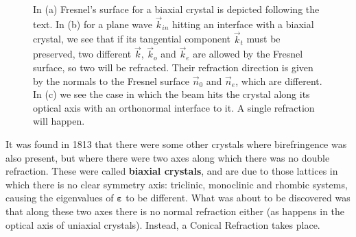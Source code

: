 \documentclass[11pt, a4paper, twoside]{article} %
\begin{document}
\begin{figure}[h!] 
     \centering 
    \begin{subfigure}[b]{0.32\linewidth}
     \end{subfigure}
 \begin{subfigure}[b]{0.33\linewidth}
     \end{subfigure}
 \begin{subfigure}[b]{0.32\linewidth}
     \end{subfigure}
    \caption{In (a) Fresnel's surface for a biaxial crystal is depicted following the text. In (b) for a plane wave $\vec{k}_{in}$ hitting an interface with a biaxial crystal, we see that if its tangential component $\vec{k}_t$ must be preserved, two different $\vec{k}$, $\vec{k}_o$ and $\vec{k}_e$ are allowed by the Fresnel surface, so two will be refracted. Their refraction direction is given by the normals to the Fresnel surface $\vec{n}_0$ and $\vec{n}_e$, which are different. In (c) we see the case in which the beam hits the crystal along its optical axis with an orthonormal interface to it. A single refraction will happen.}
        \label{fig:concentric1}

\end{figure}

It was found in 1813 that there were some other crystals where birefringence was also present, but where there were two axes along which there was no double refraction. These were called {\bf biaxial crystals}, and are due to those lattices in which there is no clear symmetry axis: triclinic, monoclinic and rhombic systems, causing the eigenvalues of $\pmb{\varepsilon}$ to be different. What was about to be discovered was that along these two axes there is no normal refraction either (as happens in the optical axis of uniaxial crystals). Instead, a Conical Refraction takes place.
\end{document}

